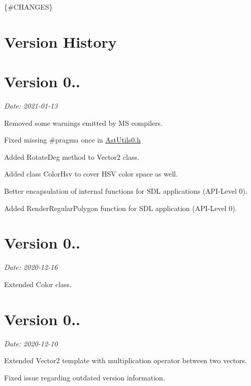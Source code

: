 \{\#\+C\+H\+A\+N\+G\+ES\} \section*{Version History}

\section*{Version 0..}

{\itshape Date\+: 2021-\/01-\/13}


\begin{DoxyItemize}
\item Removed some warnings emitted by MS compilers.
\item Fixed missing {\ttfamily \#pragma once} in \hyperlink{AstUtils0_8h}{Ast\+Utils0.\+h}
\item Added {\ttfamily Rotate\+Deg} method to {\ttfamily Vector2} class.
\item Added class \textquotesingle{} {\ttfamily Color\+Hsv} to cover H\+SV color space as well.
\item Better encapsulation of internal functions for S\+DL applications (A\+P\+I-\/\+Level 0).
\item Added {\ttfamily Render\+Regular\+Polygon} function for S\+DL application (A\+P\+I-\/\+Level 0).
\end{DoxyItemize}

\section*{Version 0..}

{\itshape Date\+: 2020-\/12-\/16}
\begin{DoxyItemize}
\item Extended {\ttfamily Color} class.
\end{DoxyItemize}

\section*{Version 0..}

{\itshape Date\+: 2020-\/12-\/10}


\begin{DoxyItemize}
\item Extended {\ttfamily Vector2} template with multiplication operator between two vectors.
\item Fixed issue regarding outdated version information.
\end{DoxyItemize}

